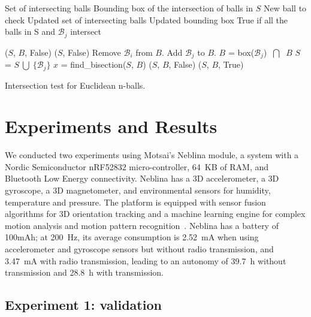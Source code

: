 \documentclass[10pt, conference, compsocconf]{IEEEtran}
\newcommand{\Desc}[2]{\State \makebox[2em][l]{#1}#2}
\begin{document}
\begin{algorithm}
\begin{algorithmic}[1]
\Input
   \Desc{$S$}{Set of intersecting balls}
   \Desc{$B$}{Bounding box of the intersection of balls in $S$}
   \Desc{$\mathcal{B}_j$}{New ball to check}
\EndInput
\Output
   \Desc{$S$}{Updated set of intersecting balls}
   \Desc{$B$}{Updated bounding box}
   \Desc{$T$}{True if all the balls in S and $\mathcal{B}_j$ intersect}
\EndOutput

 
\State \Return ($S$, $B$, False) 
\EndIf
{}
\State \Return ($S$, False) 
\EndIf
{} 
\State Remove $\mathcal{B}_i$ from $B$. Add $\mathcal{B}_j$ to $B$.
\EndIf
\State $B$ = box($\mathcal{B}_j$) $\ \bigcap\ $ $B$
\State $S$ = $S \ \bigcup \  \{\mathcal{B}_j\}$
\State $x$ = find\_bisection($S$, $B$) 
\State \Return ($S$, $B$, False)
\Else
\State \Return ($S$, $B$, True)
\EndIf
\end{algorithmic}
\caption{Intersection test for Euclidean n-balls.}
\label{algo:euclidean}
\end{algorithm}

\section{Experiments and Results}
\label{sec:results}

We conducted two experiments using Motsai's Neblina 
module, a system 
with a Nordic Semiconductor nRF52832 micro-controller, 64~KB of RAM, 
and Bluetooth Low Energy connectivity. Neblina has a 3D 
accelerometer, a 3D gyroscope, a 3D magnetometer, and environmental 
sensors for humidity, temperature and pressure. The platform is 
equipped with sensor fusion algorithms for 3D orientation tracking and 
a machine learning engine for complex motion analysis and motion 
pattern recognition~\cite{sarbishei2016accuracy}. Neblina has a 
battery of 100mAh; at 200~Hz, its average consumption is 2.52~mA when using 
accelerometer and gyroscope sensors but without radio 
transmission, and 3.47~mA with radio transmission, leading to an 
autonomy of 39.7~h without transmission and 28.8~h with transmission. 

\subsection{Experiment 1: validation}
\end{document}
